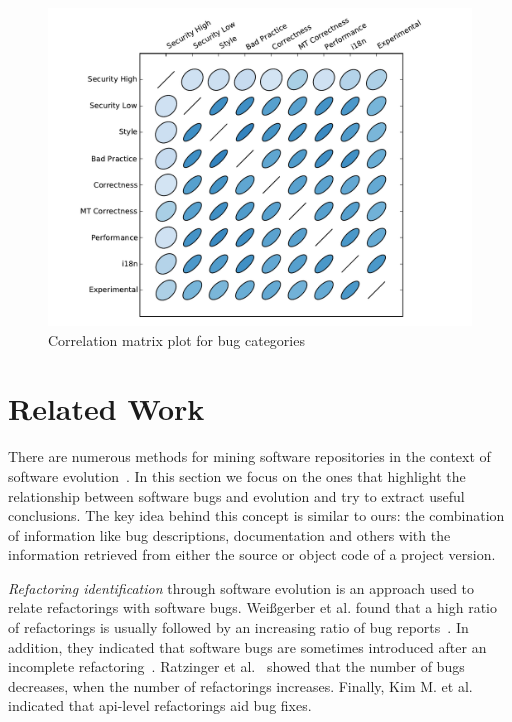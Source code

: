 \documentclass[conference]{llncs}
\begin{document}
\begin{figure}
  \centering
  \includegraphics[scale=0.6]{corrplot.pdf}
  \caption{Correlation matrix plot for bug categories}
  \label{fig:corrplot}
\end{figure}

\section{Related Work}
\label{sec:rel}

There are numerous methods for mining software repositories in the context
of software evolution~\cite{KCM07}. In this section we focus on the ones
that highlight the relationship between software bugs and evolution and try to
extract useful conclusions. The key idea behind this concept is
similar to ours: the combination of information like bug descriptions,
documentation and others with the information retrieved from either the source
or object code of a project version.

{\it Refactoring identification} through software evolution is an approach used to
relate refactorings with software bugs. Wei{\ss}gerber et al. found that a high
ratio of refactorings is usually followed by an increasing ratio of bug
reports~\cite{WD06}. In addition, they indicated that software bugs are sometimes introduced
after an incomplete refactoring~\cite{GW05}.
Ratzinger et al.~\cite{RSG08} showed that the number of bugs decreases, when the number of
refactorings increases. Finally, Kim M. et al.~\cite{KCK11} indicated that {\sc api}-level
refactorings aid bug fixes.
\end{document}
